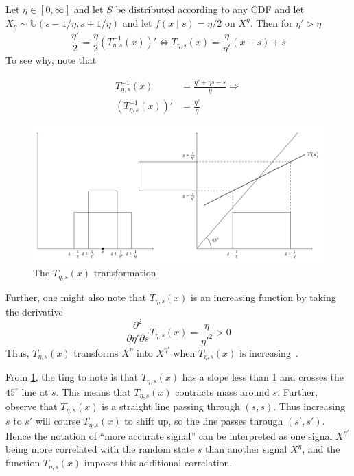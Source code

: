 \documentclass[10pt,a4paper]{article} 					%
\begin{document}
\begin{example}\label{ex:t-transformation-1}
Let  \(\eta\in[0,\infty]\) and let \(S\) be distributed according to any CDF and let \(X_{\eta}\sim\mathbb{U}(s-1/\eta,s+1/\eta)\) and let \(f(x\mid s)=\eta\big /2\) on \(X^\eta\). Then for \(\eta'>\eta\)
\[
	\frac{\eta'}{2}=\frac{\eta}{2}\left(T_{\eta,s}^{-1}(x)\right)'\Leftrightarrow T_{\eta,s}(x)=\frac{\eta}{\eta'}(x-s)+s
\]
To see why, note that

\begin{align*}
	T^{-1}_{\eta,s}(x)               &=\frac{\eta'+\eta s-s}{\eta} \Rightarrow \\
	\left(T^{-1}_{\eta,s}(x)\right)' &=\frac{\eta'}{\eta}
\end{align*}

\begin{figure}
	\includegraphics[width=\textwidth]{t-transformation.pdf}
	\caption{\label{fig:t-transformation}The \(T_{\eta,s}(x)\) transformation}
\end{figure}

Further, one might also note that \(T_{\eta,s}(x)\) is an increasing function by taking the derivative
\[
	\frac{\partial^2}{\partial \eta'\partial s}T_{\eta,s}(x)=\frac{\eta}{\eta'^2}>0
\]
Thus, \(T_{\eta,s}(x)\) transforms \(X^{\eta}\) into \(X^{\eta'}\) when \(T_{\eta,s}(x)\) is increasing~\citep{Persico1996}.

From \cref{fig:t-transformation}, the ting to note is that \(T_{\eta,s}(x)\) has a slope less than 1 and crosses the \(45^\circ\) line at \(s\). This means that \(T_{\eta,s}(x)\) contracts mass around \(s\). Further, observe that \(T_{\eta,s}(x)\) is a straight line passing through \((s,s)\). Thus increasing \(s\) to \(s'\) will course \(T_{\eta,s}(x)\) to shift up, so the line passes through \((s',s')\). Hence the notation of ``more accurate signal'' can be interpreted as one signal \(X^{\eta'}\) being more correlated with the random state \(s\) than another signal \(X^\eta\), and the function \(T_{\eta,s}(x)\) imposes this additional correlation.
\end{example}
\end{document}
